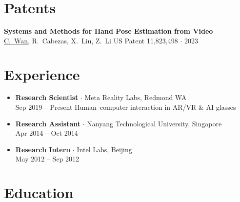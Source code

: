 \documentclass[10pt, letterpaper]{article}
\newcommand{\me}[1]{\underline{#1}}
\begin{document}
\vspace{2pt}

\section{Patents}

{\small\textbf{Systems and Methods for Hand Pose Estimation from Video}}\\
{\footnotesize\color{midgray} \me{C.~Wan}, R.~Cabezas, X.~Liu, Z.~Li \quad US Patent 11,823,498 $\cdot$ 2023}

\vspace{2pt}

\section{Experience}

\begin{itemize}[leftmargin=0pt, itemsep=3pt, parsep=0pt, topsep=1pt, label={}]

  \item {\small\textbf{Research Scientist} $\cdot$ Meta Reality Labs, Redmond WA}\\
    {\footnotesize\color{midgray} Sep 2019 -- Present \quad Human--computer interaction in AR/VR \& AI glasses}

  \item {\small\textbf{Research Assistant} $\cdot$ Nanyang Technological University, Singapore}\\
    {\footnotesize\color{midgray} Apr 2014 -- Oct 2014}

  \item {\small\textbf{Research Intern} $\cdot$ Intel Labs, Beijing}\\
    {\footnotesize\color{midgray} May 2012 -- Sep 2012}

\end{itemize}

\vspace{2pt}

\section{Education}
\end{document}
